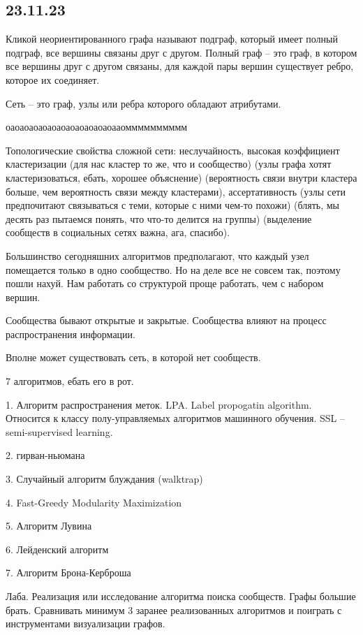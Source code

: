 \subsection{23.11.23}

Кликой неориентированного графа называют подграф, который имеет полный подграф, все вершины связаны друг с другом. Полный граф -- это граф, в котором все вершины друг с другом связаны, для каждой пары вершин существует ребро, которое их соединяет.

Сеть -- это граф, узлы или ребра которого обладают атрибутами.

оаоаоаоаоаоаоаоаоаоаоаоааомммммммммм

Топологические свойства сложной сети: неслучайность, высокая коэффициент кластеризации (для нас кластер то же, что и сообщество) (узлы графа хотят кластеризоваться, ебать, хорошее объяснение) (вероятность связи внутри кластера больше, чем вероятность связи между кластерами), ассертативность (узлы сети предпочитают связываться с теми, которые с ними чем-то похожи) (блять, мы десять раз пытаемся понять, что что-то делится на группы) (выделение сообществ в социальных сетях важна, ага, спасибо).

Большинство сегодняшних алгоритмов предполагают, что каждый узел помещается только в одно сообщество. Но на деле все не совсем так, поэтому пошли нахуй. Нам работать со структурой проще работать, чем с набором вершин.

Сообщества бывают открытые и закрытые. Сообщества влияют на процесс распространения информации.

Вполне может существовать сеть, в которой нет сообществ.

7 алгоритмов, ебать его в рот.

1. Алгоритм распространения меток. LPA. Label propogatin algorithm. Относится к классу полу-управляемых алгоритмов машинного обучения. SSL -- semi-supervised learning.

2. гирван-ньюмана

3. Случайный алгоритм блуждания (walktrap)

4. Fast-Greedy Modularity Maximization

5. Алгоритм Лувина

6. Лейденский алгоритм

7. Алгоритм Брона-Керброша

Лаба. Реализация или исследование алгоритма поиска сообществ. Графы большие брать. Сравнивать минимум 3 заранее реализованных алгоритмов и поиграть с инструментами визуализации графов.